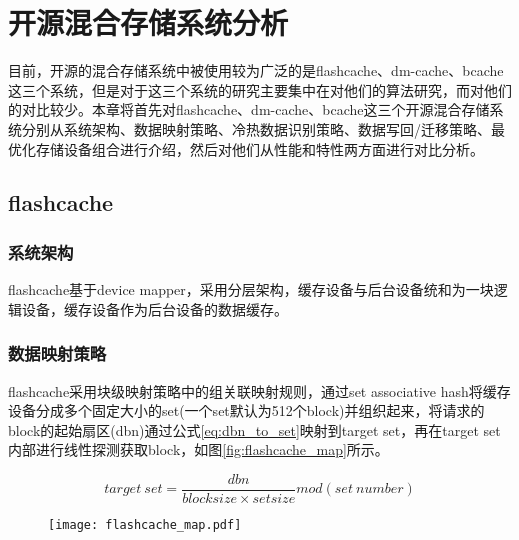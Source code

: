 
\chapter{开源混合存储系统分析}
\label{chap:opensource_intro}

目前，开源的混合存储系统中被使用较为广泛的是flashcache、dm-cache、bcache这三个系统，但是对于这三个系统的研究主要集中在对他们的算法研究\cite{杨宗2013flashcache, 唐华敏2015bcache}，而对他们的对比较少。本章将首先对flashcache、dm-cache、bcache这三个开源混合存储系统分别从系统架构、数据映射策略、冷热数据识别策略、数据写回/迁移策略、最优化存储设备组合进行介绍，然后对他们从性能和特性两方面进行对比分析。

\section{flashcache}

\subsection{系统架构}

flashcache基于device mapper，采用分层架构，缓存设备与后台设备统和为一块逻辑设备，缓存设备作为后台设备的数据缓存。

\subsection{数据映射策略}
\label{sec:flashcache_mapping}
flashcache采用块级映射策略中的组关联映射规则，通过set associative hash\cite{kimmel2014set}将缓存设备分成多个固定大小的set(一个set默认为512个block)并组织起来，将请求的block的起始扇区(dbn)通过公式\ref{eq:dbn_to_set}映射到target set，再在target set内部进行线性探测获取block，如图\ref{fig:flashcache_map}所示。

\begin{equation}
    \label{eq:dbn_to_set}
    target \ set = \frac{dbn}{block size \times set size} mod (set \  number)
\end{equation}

\begin{figure}[!htp]
    \centering
    \texttt{[image: flashcache\_map.pdf]}
\end{figure}

